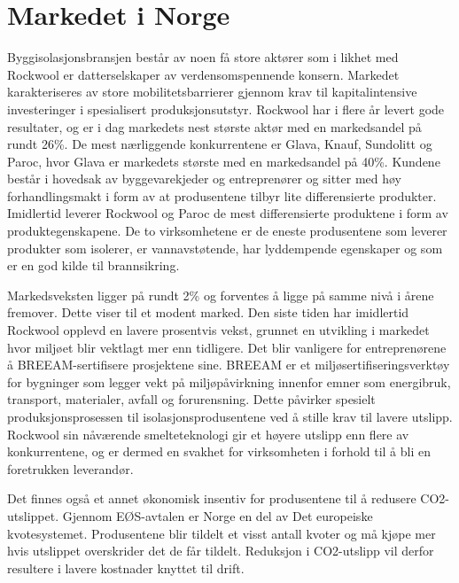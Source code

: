 \section{Markedet i Norge}  
Byggisolasjonsbransjen består av noen få store aktører som i likhet med Rockwool er datterselskaper av verdensomspennende konsern. Markedet karakteriseres av store mobilitetsbarrierer gjennom krav til kapitalintensive investeringer i spesialisert produksjonsutstyr. Rockwool har i flere år levert gode resultater, og er i dag markedets nest største aktør med en markedsandel på rundt 26\%. De mest nærliggende konkurrentene er Glava, Knauf, Sundolitt og Paroc, hvor Glava er markedets største med en markedsandel på 40\%. Kundene består i hovedsak av byggevarekjeder og entreprenører og sitter med høy forhandlingsmakt i form av at produsentene tilbyr lite differensierte produkter. Imidlertid leverer Rockwool og Paroc de mest differensierte produktene i form av produktegenskapene. De to virksomhetene er de eneste produsentene som leverer produkter som isolerer, er vannavstøtende, har lyddempende egenskaper og som er en god kilde til brannsikring. 

\indent \newline
Markedsveksten ligger på rundt 2\% og forventes å ligge på samme nivå i årene fremover. Dette viser til et modent marked. Den siste tiden har imidlertid Rockwool opplevd en lavere prosentvis vekst, grunnet en utvikling i markedet hvor miljøet blir vektlagt mer enn tidligere. Det blir vanligere for entreprenørene å BREEAM-sertifisere prosjektene sine. BREEAM er et miljøsertifiseringsverktøy for bygninger som legger vekt på miljøpåvirkning innenfor emner som energibruk, transport, materialer, avfall og forurensning\cite{breeam}. Dette påvirker spesielt produksjonsprosessen til isolasjonsprodusentene ved å stille krav til lavere utslipp. Rockwool sin nåværende smelteteknologi gir et høyere utslipp enn flere av konkurrentene, og er dermed en svakhet for virksomheten i forhold til å bli en foretrukken leverandør. 

\indent \newline
Det finnes også et annet økonomisk insentiv for produsentene til å redusere CO2-utslippet. Gjennom EØS-avtalen er Norge en del av Det europeiske kvotesystemet. Produsentene blir tildelt et visst antall kvoter og må kjøpe mer hvis utslippet overskrider det de får tildelt. Reduksjon i CO2-utslipp vil derfor resultere i lavere kostnader knyttet til drift.
